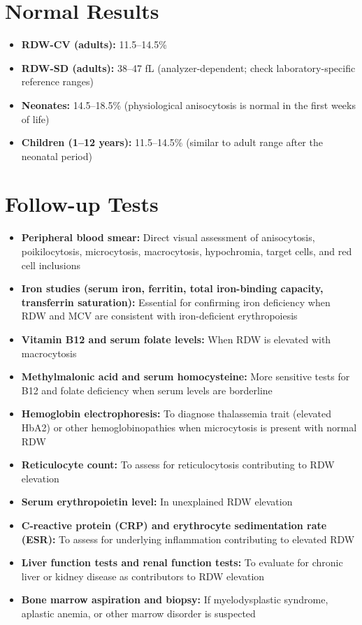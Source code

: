 \section*{Normal Results}
\begin{itemize}
  \item \textbf{RDW-CV (adults):} 11.5--14.5\%
  \item \textbf{RDW-SD (adults):} 38--47 fL (analyzer-dependent; check laboratory-specific reference ranges)
  \item \textbf{Neonates:} 14.5--18.5\% (physiological anisocytosis is normal in the first weeks of life)
  \item \textbf{Children (1--12 years):} 11.5--14.5\% (similar to adult range after the neonatal period)
\end{itemize}

\section*{Follow-up Tests}
\begin{itemize}
  \item \textbf{Peripheral blood smear:} Direct visual assessment of anisocytosis, poikilocytosis, microcytosis, macrocytosis, hypochromia, target cells, and red cell inclusions
  \item \textbf{Iron studies (serum iron, ferritin, total iron-binding capacity, transferrin saturation):} Essential for confirming iron deficiency when RDW and MCV are consistent with iron-deficient erythropoiesis
  \item \textbf{Vitamin B12 and serum folate levels:} When RDW is elevated with macrocytosis
  \item \textbf{Methylmalonic acid and serum homocysteine:} More sensitive tests for B12 and folate deficiency when serum levels are borderline
  \item \textbf{Hemoglobin electrophoresis:} To diagnose thalassemia trait (elevated HbA2) or other hemoglobinopathies when microcytosis is present with normal RDW
  \item \textbf{Reticulocyte count:} To assess for reticulocytosis contributing to RDW elevation
  \item \textbf{Serum erythropoietin level:} In unexplained RDW elevation
  \item \textbf{C-reactive protein (CRP) and erythrocyte sedimentation rate (ESR):} To assess for underlying inflammation contributing to elevated RDW
  \item \textbf{Liver function tests and renal function tests:} To evaluate for chronic liver or kidney disease as contributors to RDW elevation
  \item \textbf{Bone marrow aspiration and biopsy:} If myelodysplastic syndrome, aplastic anemia, or other marrow disorder is suspected
\end{itemize}

